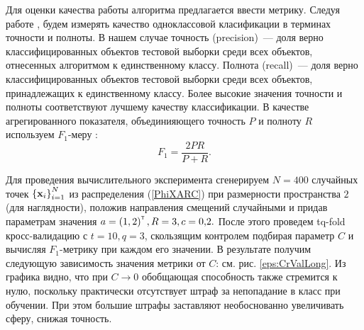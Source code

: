 Для оценки качества работы алгоритма предлагается ввести метрику. 
Следуя работе  \cite{Romanenko2012}, будем измерять качество одноклассовой класификации в терминах точности и полноты. 
В нашем случае точность (precision)~--- доля верно классифицированных объектов тестовой выборки среди всех объектов, отнесенных алгоритмом к единственному классу. Полнота (recall)~--- доля верно классифицированных объектов тестовой выборки среди всех объектов, принадлежащих к единственному классу. Более высокие значения точности и полноты соответствуют лучшему качеству классификации. В качестве агрегированного показателя, объединияющего точность $P$ и полноту $R$ используем $F_1$-меру \cite{Rijsbergen1979}:
$$F_1 = \frac{2PR}{P+R}.$$

Для проведения вычислительного эксперимента сгенерируем $N=400$ случайных точек $\left\{\boldsymbol{\mathbf{x}}_i\right\}_{i=1}^N$ из распределения (\ref{PhiXARC}) при размерности пространства $2$ (для наглядности), положив направления смещений случайными и придав параметрам значения $a = \left(1,2\right)^{\text{\tiny\sffamily\upshape\mdseries T}}, R = 3, c = 0{,}2.$
После этого проведем tq-fold кросс-валидацию с $t = 10, q = 3$, скользящим контролем подбирая параметр $C$ и вычисляя $F_1$-метрику при каждом его значении. В результате получим следующую зависимость значения метрики от $C$: см. рис. \ref{eps:CrValLong}.
Из графика видно, что при $C\to 0$ обобщающая способность также стремится к нулю, поскольку практически отсутствует штраф за непопадание в класс при обучении. При этом большие штрафы заставляют необоснованно увеличивать сферу, снижая точность.

